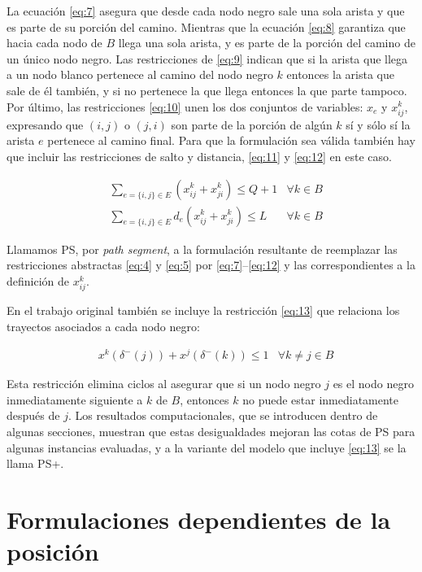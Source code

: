 \documentclass[10pt, a4paper]{article}
\theoremstyle{definition}
\begin{document}
La ecuación \ref{eq:7} asegura que desde cada nodo negro sale una sola arista y que es parte de su porción del camino. Mientras que la ecuación \ref{eq:8} garantiza que hacia cada nodo de $B$ llega una sola arista, y es parte de la porción del camino de un único nodo negro. Las restricciones de \ref{eq:9} indican que si la arista que llega a un nodo blanco pertenece al camino del nodo negro $k$ entonces la arista que sale de él también, y si no pertenece la que llega entonces la que parte tampoco. Por último, las restricciones \ref{eq:10} unen los dos conjuntos de variables: $x_{e}$ y $x_{i j}^{k}$, expresando que $(i,j)$ o $(j,i)$ son parte de la porción de algún $k$ sí y sólo sí la arista $e$ pertenece al camino final. Para que la formulación sea válida también hay que incluir las restricciones de salto y distancia, \ref{eq:11} y \ref{eq:12} en este caso.

\begin{align} 
	& \sum_{e=\{i, j\} \in E}\left(x_{i j}^{k}+x_{j i}^{k}\right) \leq Q+1 & \forall k \in B \label{eq:11} \\
	& \sum_{e=\{i, j\} \in E} d_{e}\left(x_{i j}^{k}+x_{j i}^{k}\right) \leq L & \forall k \in B \label{eq:12}
\end{align}

Llamamos PS, por \textit{path segment}, a la formulación resultante de reemplazar las restricciones abstractas \ref{eq:4} y \ref{eq:5} por \ref{eq:7}–\ref{eq:12} y las correspondientes a la definición de $x_{i j}^{k}$.

En el trabajo original también se incluye la restricción \ref{eq:13} que relaciona los trayectos asociados a cada nodo negro:

\begin{align}
	& x^{k}\left(\delta^{-}(j)\right)+x^{j}\left(\delta^{-}(k)\right) \leq 1 & \forall k \neq j \in B \label{eq:13}
\end{align}

Esta restricción elimina ciclos al asegurar que si un nodo negro $j$ es el nodo negro inmediatamente siguiente a $k$ de $B$, entonces $k$ no puede estar inmediatamente después de $j$. Los resultados computacionales, que se introducen dentro de algunas secciones, muestran que estas desigualdades mejoran las cotas de PS para algunas instancias evaluadas, y a la variante del modelo que incluye \ref{eq:13} se la llama PS+.

\section{Formulaciones dependientes de la posición}
\end{document}
